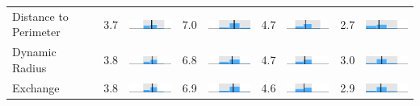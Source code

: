 \begin{table}
\begin{tabular}{l rm{7em} rm{7em} rm{7em} rm{7em}}
Distance to Perimeter  &   3.7 &     \includegraphics[width=7em]{mini_hist/WI_2004_rohrbach} &   7.0 &     \includegraphics[width=7em]{mini_hist/WI_2008_rohrbach} &   4.7 &     \includegraphics[width=7em]{mini_hist/WI_2012_rohrbach} &   2.7 &     \includegraphics[width=7em]{mini_hist/WI_2016_rohrbach} \\
Dynamic Radius         &   3.8 &   \includegraphics[width=7em]{mini_hist/WI_2004_dyn_radius} &   6.8 &   \includegraphics[width=7em]{mini_hist/WI_2008_dyn_radius} &   4.7 &   \includegraphics[width=7em]{mini_hist/WI_2012_dyn_radius} &   3.0 &   \includegraphics[width=7em]{mini_hist/WI_2016_dyn_radius} \\
Exchange               &   3.8 &     \includegraphics[width=7em]{mini_hist/WI_2004_exchange} &   6.9 &     \includegraphics[width=7em]{mini_hist/WI_2008_exchange} &   4.6 &     \includegraphics[width=7em]{mini_hist/WI_2012_exchange} &   2.9 &     \includegraphics[width=7em]{mini_hist/WI_2016_exchange} \\

\end{tabular}
\end{table}
